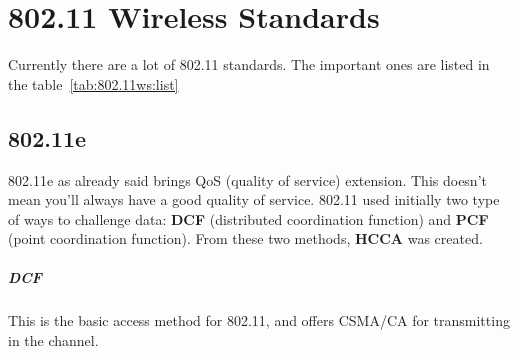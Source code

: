\chapter{802.11 Wireless Standards}

Currently there are a lot of 802.11 standards. The important ones are listed
in the table~\ref{tab:802.11ws:list}

\begin{table}[t]
\centering
{}
\caption{List of most important 802.11 wireless standards}
\label{tab:802.11ws:list}
\end{table}

\section{802.11e}

802.11e as already said brings QoS (quality of service) extension. This doesn't
mean you'll always have a good quality of service.
802.11 used initially two type of ways to challenge data: \textbf{DCF}
(distributed coordination function) and \textbf{PCF} (point coordination
function). From these two methods, \textbf{HCCA} was created.

\paragraph*{DCF} This is the basic access method for 802.11, and offers CSMA/CA
for transmitting in the channel.


